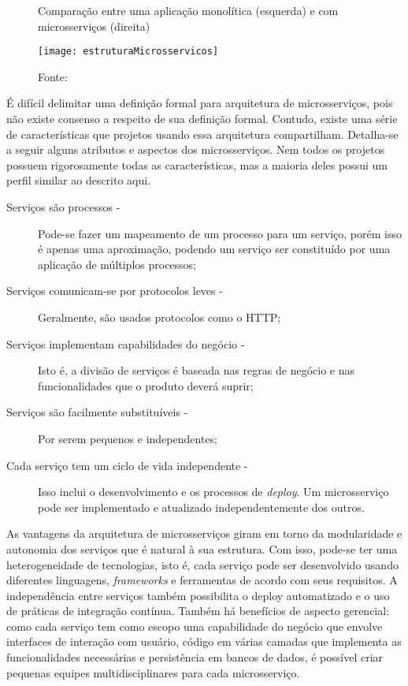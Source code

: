 \begin{figure}[H]
	\centering
	\caption{Comparação entre uma aplicação monolítica (esquerda) e com microsserviços (direita)}
  \texttt{[image: estruturaMicrosservicos]}
	\caption*{Fonte: \cite{lewis}}
\label{fig:estruturaMicrosservicos}
\end{figure}

É difícil delimitar uma definição formal para arquitetura de microsserviços, pois não existe consenso a respeito de sua definição formal. Contudo, existe uma série de características que projetos usando essa arquitetura compartilham. Detalha-se a seguir alguns atributos e aspectos dos microsserviços. Nem todos os projetos possuem rigorosamente todas as características, mas a maioria deles possui um perfil similar ao descrito aqui.

\begin{description}
\item[Serviços são processos -]Pode-se fazer um mapeamento de um processo para um serviço, porém isso é apenas uma aproximação, podendo um serviço ser constituído por uma aplicação de múltiplos processos;
\item[Serviços comunicam-se por protocolos leves -]Geralmente, são usados protocolos como o HTTP;
\item[Serviços implementam capabilidades do negócio -]Isto é, a divisão de serviços é baseada nas regras de negócio e nas funcionalidades que o produto deverá suprir;
\item[Serviços são facilmente substituíveis - ]Por serem pequenos e independentes;
\item[Cada serviço tem um ciclo de vida independente -]Isso inclui o desenvolvimento e os processos de \emph{deploy}. Um microsserviço pode ser implementado e atualizado independentemente dos outros.
\end{description}

As vantagens da arquitetura de microsserviços giram em torno da modularidade e autonomia dos serviços que é natural à sua estrutura. Com isso, pode-se ter uma heterogeneidade de tecnologias, isto é, cada serviço pode ser desenvolvido usando diferentes linguagens, \textit{frameworks} e ferramentas de acordo com seus requisitos. A independência entre serviços também possibilita o deploy automatizado e o uso de práticas de integração contínua. Também há benefícios de aspecto gerencial: como cada serviço tem como escopo uma capabilidade do negócio que envolve interfaces de interação com usuário, código em várias camadas que implementa as funcionalidades necessárias e persistência em bancos de dados, é possível criar pequenas equipes multidisciplinares para cada microsserviço.

